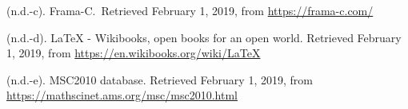 \documentclass[12pt,twoside]{article}
\begin{document}
{\begin{thebibliography}{1079}
\mdbibitemlabel{}(n.d.-c). Frama-C.~Retrieved February 1, 2019, from \href{https://frama-c.com/}{{\ttfamily https://\hspace{0pt}frama-\hspace{0pt}c.\hspace{0pt}com/\hspace{0pt}}}%

\mdbibitemlabel{}(n.d.-d). LaTeX - Wikibooks, open books for an open world. Retrieved February 1, 2019, from \href{https://en.wikibooks.org/wiki/LaTeX}{{\ttfamily https://\hspace{0pt}en.\hspace{0pt}wikibooks.\hspace{0pt}org/\hspace{0pt}wiki/\hspace{0pt}LaTeX}}%

\mdbibitemlabel{}(n.d.-e). MSC2010 database. Retrieved February 1, 2019, from \href{https://mathscinet.ams.org/msc/msc2010.html}{{\ttfamily https://\hspace{0pt}mathscinet.\hspace{0pt}ams.\hspace{0pt}org/\hspace{0pt}msc/\hspace{0pt}msc2010.\hspace{0pt}html}}%
\par%
\end{thebibliography}}%
\end{document}
